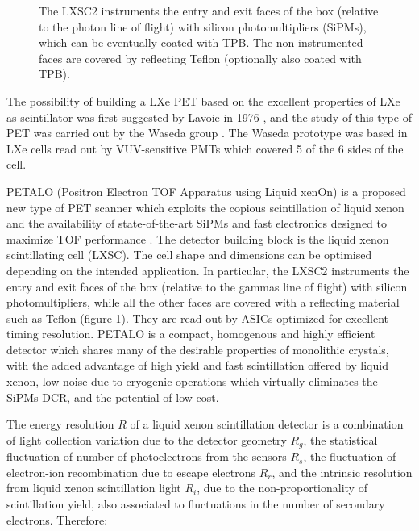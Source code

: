 \documentclass[11pt,a4paper]{article}
\begin{document}
\begin{figure}[!htbp]
	\caption{The LXSC2 instruments the entry and exit faces of the box (relative to the photon line of flight) with silicon photomultipliers (SiPMs), which can be eventually coated with TPB. The non-instrumented faces are covered by reflecting Teflon (optionally also coated with TPB).}\label{fig.box} 
\end{figure}

The possibility of building a LXe PET based on the excellent properties of LXe as scintillator was first suggested by Lavoie in 1976 \cite{lavoie}, and the study of this type of PET was carried out by the Waseda group \cite{Doke1,Nishikido2,Nishikido1}. The Waseda prototype was based in LXe cells read out by VUV-sensitive PMTs which covered 5 of the 6 sides of the cell.

PETALO (Positron Electron TOF Apparatus using Liquid xenOn) is a proposed new type of PET scanner which exploits the copious scintillation of liquid xenon and the availability of state-of-the-art SiPMs and fast electronics designed to maximize TOF performance \cite{Petalo2015}. The detector building block is the liquid xenon scintillating cell (LXSC). The cell shape and dimensions can be optimised depending on the intended application. In particular, the LXSC2 instruments the entry and exit faces of the box (relative to the gammas line of flight) with silicon photomultipliers, while all the other faces are covered with a reflecting material such as Teflon (figure \ref{fig.box}). They are read out by ASICs optimized for excellent timing resolution. PETALO is a compact, homogenous and highly efficient detector which shares many of the desirable properties of monolithic crystals, with the added advantage of high yield and fast scintillation offered by liquid xenon, low noise due to cryogenic operations which virtually eliminates the SiPMs DCR, and the potential of low cost. 

The energy resolution $R$ of a liquid xenon scintillation detector is a combination of light collection variation due to the detector geometry $R_g$, the statistical fluctuation of number of photoelectrons from the sensors $R_s$, the fluctuation of electron-ion recombination due to escape electrons $R_r$, and the intrinsic resolution from liquid xenon scintillation light $R_i$, due to the non-proportionality of scintillation yield, also associated to fluctuations in the number of secondary electrons. Therefore:
\end{document}
